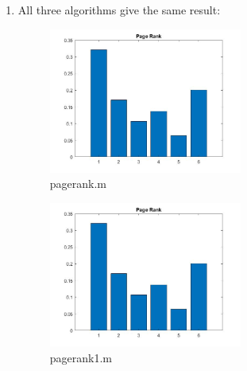 \documentclass[unicode,11pt,a4paper,oneside,numbers=endperiod,openany]{scrartcl}
\begin{document}
\begin{enumerate}
    \item All three algorithms give the same result:
    \begin{figure}[H]
    \centering
    
    \includegraphics[width=0.6\textwidth]{ex5_4_0.jpg}
    \caption{pagerank.m}
    \end{figure}
    \begin{figure}[H]
    \centering
    
    \includegraphics[width=0.6\textwidth]{ex5_4_0.jpg}
    \caption{pagerank1.m}
    \end{figure}
    \begin{figure}[H]
    \centering
    

\end{figure}
\end{enumerate}
\end{document}
